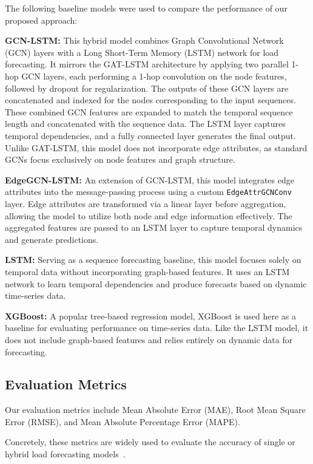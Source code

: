 \documentclass[sigconf,nonacm]{acmart}
\begin{document}
The following baseline models were used to compare the performance of our proposed approach:

\textbf{GCN-LSTM:} This hybrid model combines Graph Convolutional Network (GCN) layers with a Long Short-Term Memory (LSTM) network for load forecasting. It mirrors the GAT-LSTM architecture by applying two parallel 1-hop GCN layers, each performing a 1-hop convolution on the node features, followed by dropout for regularization. The outputs of these GCN layers are concatenated and indexed for the nodes corresponding to the input sequences. These combined GCN features are expanded to match the temporal sequence length and concatenated with the sequence data. The LSTM layer captures temporal dependencies, and a fully connected layer generates the final output. Unlike GAT-LSTM, this model does not incorporate edge attributes, as standard GCNs focus exclusively on node features and graph structure.

\textbf{EdgeGCN-LSTM:} An extension of GCN-LSTM, this model integrates edge attributes into the message-passing process using a custom \texttt{EdgeAttrGCNConv} layer. Edge attributes are transformed via a linear layer before aggregation, allowing the model to utilize both node and edge information effectively. The aggregated features are passed to an LSTM layer to capture temporal dynamics and generate predictions.

\textbf{LSTM:} Serving as a sequence forecasting baseline, this model focuses solely on temporal data without incorporating graph-based features. It uses an LSTM network to learn temporal dependencies and produce forecasts based on dynamic time-series data.

\textbf{XGBoost:} A popular tree-based regression model, XGBoost is used here as a baseline for evaluating performance on time-series data. Like the LSTM model, it does not include graph-based features and relies entirely on dynamic data for forecasting.

\subsection{Evaluation Metrics}

Our evaluation metrics include Mean Absolute Error (MAE), Root Mean Square Error (RMSE), and Mean Absolute Percentage Error (MAPE).

Concretely, these metrics are widely used to evaluate the accuracy of single or hybrid load forecasting models~\cite{Pinson2013,Mamun2020}.
\end{document}

